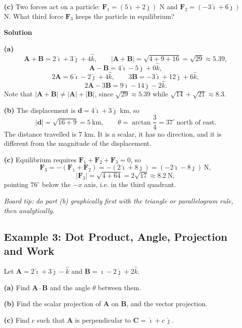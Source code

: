 \documentclass[12pt]{article}
\begin{document}
\textbf{(c)} Two forces act on a particle: $\mathbf{F}_1 = (5\hat{\imath}+2\hat{\jmath})$ N and $\mathbf{F}_2 = (-3\hat{\imath}+6\hat{\jmath})$ N. What third force $\mathbf{F}_3$ keeps the particle in equilibrium?

\bigskip
\textbf{Solution}

\textbf{(a)}
\[
\mathbf{A}+\mathbf{B} = 2\hat{\imath} + 3\hat{\jmath} + 4\hat{k},
\qquad
|\mathbf{A}+\mathbf{B}| = \sqrt{4+9+16} = \sqrt{29} \approx 5.39,
\]
\[
\mathbf{A}-\mathbf{B} = 4\hat{\imath} - 5\hat{\jmath} + 0\hat{k},
\]
\[
2\mathbf{A} = 6\hat{\imath}-2\hat{\jmath}+4\hat{k},
\qquad
3\mathbf{B} = -3\hat{\imath}+12\hat{\jmath}+6\hat{k},
\]
\[
2\mathbf{A}-3\mathbf{B} = 9\hat{\imath} - 14\hat{\jmath} - 2\hat{k}.
\]
Note that $|\mathbf{A}+\mathbf{B}| \neq |\mathbf{A}|+|\mathbf{B}|$, since $\sqrt{29}\approx 5.39$ while $\sqrt{14}+\sqrt{21}\approx 8.3$.

\textbf{(b)} The displacement is $\mathbf{d} = 4\hat{\imath}+3\hat{\jmath}$ km, so
\[
|\mathbf{d}| = \sqrt{16+9} = 5\ \text{km},
\qquad
\theta = \arctan\frac{3}{4} = 37^\circ \ \text{north of east}.
\]
The distance travelled is $7$ km. It is a scalar, it has no direction, and it is different from the magnitude of the displacement.

\textbf{(c)} Equilibrium requires $\mathbf{F}_1+\mathbf{F}_2+\mathbf{F}_3 = 0$, so
\[
\mathbf{F}_3 = -(\mathbf{F}_1+\mathbf{F}_2) = -(2\hat{\imath}+8\hat{\jmath}) = (-2\hat{\imath}-8\hat{\jmath})\ \text{N},
\]
\[
|\mathbf{F}_3| = \sqrt{4+64} = 2\sqrt{17} \approx 8.2\ \text{N},
\]
pointing $76^\circ$ below the $-x$ axis, i.e. in the third quadrant.

\bigskip
\noindent \emph{Board tip: do part (b) graphically first with the triangle or parallelogram rule, then analytically.}


\subsection{Example 3: Dot Product, Angle, Projection and Work}

Let $\mathbf{A} = 2\hat{\imath}+3\hat{\jmath}-\hat{k}$ and $\mathbf{B} = \hat{\imath}-2\hat{\jmath}+2\hat{k}$.

\textbf{(a)} Find $\mathbf{A}\cdot\mathbf{B}$ and the angle $\theta$ between them.

\textbf{(b)} Find the scalar projection of $\mathbf{A}$ on $\mathbf{B}$, and the vector projection.

\textbf{(c)} Find $c$ such that $\mathbf{A}$ is perpendicular to $\mathbf{C} = \hat{\imath} + c\,\hat{\jmath}$.
\end{document}
